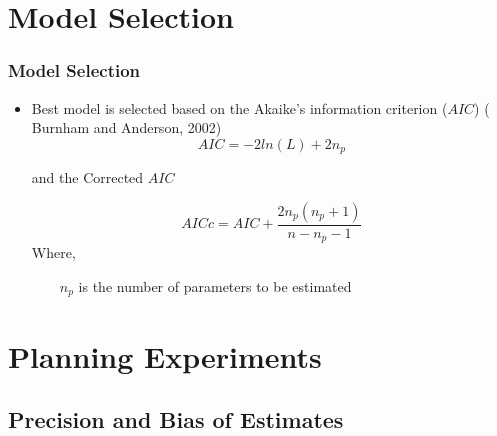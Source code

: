 \documentclass{beamer}
\begin{document}

\section{Model Selection}
\begin{frame} \frametitle{Model Selection}
{\scriptsize 
\begin{itemize}
\item Best model is selected based on the Akaike's information criterion ($AIC$) ( Burnham and Anderson, 2002)
$$ AIC = -2 ln(L)  + 2n_{p}$$
\vspace{12pt}

and the Corrected $AIC$

$$ AICc = AIC + \frac{2n_{p}(n_{p}+1)}{n-n_{p}-1} $$
Where,

$\qquad n_{p}$ is the number of parameters to be estimated 

\vspace{12pt}
\end{itemize}
}
\end{frame}

\section{Planning Experiments}
\subsection{Precision and Bias of Estimates}
\end{document}
